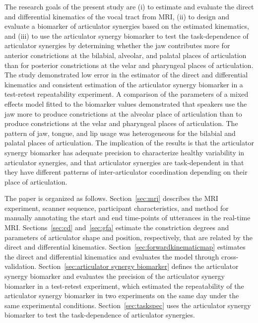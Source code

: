 \documentclass[preprint]{JASAnew}\usepackage[]{graphicx}\usepackage[]{color}
\begin{document}
The research goals of the present study are 
%
(i) to estimate and evaluate the direct and differential kinematics of the vocal tract from MRI, 
%
(ii) to design and evaluate a biomarker of articulator synergies based on the estimated kinematics, and
%
(iii) to use the articulator synergy biomarker to test the task-dependence of articulator synergies by determining whether the jaw contributes more for anterior constrictions at the bilabial, alveolar, and palatal places of articulation than for posterior constrictions at the velar and pharyngeal places of articulation. 
%
The study demonstrated low error in the estimator of the direct and differential kinematics and consistent estimation of the articulator synergy biomarker in a test-retest repeatability experiment.
%
A comparison of the parameters of a mixed effects model fitted to the biomarker values demonstrated that speakers use the jaw more to produce constrictions at the alveolar place of articulation than to produce constrictions at the velar and pharyngeal places of articulation. 
%
The pattern of jaw, tongue, and lip usage was heterogeneous for the bilabial and palatal places of articulation.
%
The implication of the results is that the articulator synergy biomarker has adequate precision to characterize healthy variability in articulator synergies, and that articulator synergies are task-dependent in that they have different patterns of inter-articulator coordination depending on their place of articulation. 


The paper is organized as follows.
%
Section~\ref{sec:mri} describes the MRI experiment, scanner sequence, participant characteristics, and method for manually annotating the start and end time-points of utterances in the real-time MRI.
%
Sections~\ref{sec:cd} and~\ref{sec:gfa} estimate the constriction degrees and parameters of articulator shape and position, respectively, that are related by the direct and differential kinematics. 
% 
Section~\ref{sec:forwardkinematicmap} estimates the direct and differential kinematics and evaluates the model through cross-validation. 
%
Section~\ref{sec:articulator synergy biomarker} defines the articulator synergy biomarker and evaluates the precision of the articulator synergy biomarker in a test-retest experiment, which estimated the repeatability of the articulator synergy biomarker in two experiments on the same day under the same experimental conditions. 
% 
Section~\ref{sec:taskspec} uses the articulator synergy biomarker to test the task-dependence of articulator synergies.   
\end{document}
